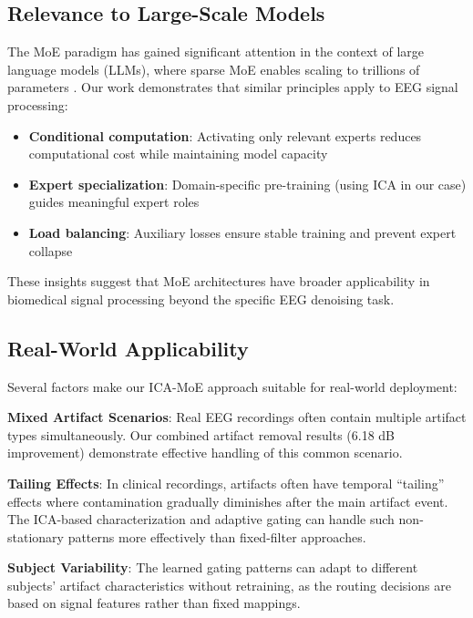 \documentclass[journal]{IEEEtran}
\begin{document}
\subsection{Relevance to Large-Scale Models}

The MoE paradigm has gained significant attention in the context of large language models (LLMs), where sparse MoE enables scaling to trillions of parameters \cite{fedus2022switch, jiang2024mixtral}. Our work demonstrates that similar principles apply to EEG signal processing:

\begin{itemize}
\item \textbf{Conditional computation}: Activating only relevant experts reduces computational cost while maintaining model capacity
\item \textbf{Expert specialization}: Domain-specific pre-training (using ICA in our case) guides meaningful expert roles
\item \textbf{Load balancing}: Auxiliary losses ensure stable training and prevent expert collapse
\end{itemize}

These insights suggest that MoE architectures have broader applicability in biomedical signal processing beyond the specific EEG denoising task.

\subsection{Real-World Applicability}

Several factors make our ICA-MoE approach suitable for real-world deployment:

\textbf{Mixed Artifact Scenarios}: Real EEG recordings often contain multiple artifact types simultaneously. Our combined artifact removal results (6.18 dB improvement) demonstrate effective handling of this common scenario.

\textbf{Tailing Effects}: In clinical recordings, artifacts often have temporal ``tailing'' effects where contamination gradually diminishes after the main artifact event. The ICA-based characterization and adaptive gating can handle such non-stationary patterns more effectively than fixed-filter approaches.

\textbf{Subject Variability}: The learned gating patterns can adapt to different subjects' artifact characteristics without retraining, as the routing decisions are based on signal features rather than fixed mappings.
\end{document}
